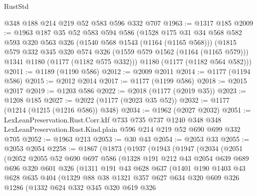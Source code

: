 \begin{lexlean}{RustStd}
\begin{coremodule}
    @348
    @188
    @214
    @219
    @52
    @583
    @596
    @332
    @707
@1963 := @1317 @185
@2009 := @1963
    @187
    @35
    @52
    @583
    @594
    @586
    (@1528
      @175
      @31
      @34
      @568
      @582
      @593
      @320
      @563
      @326
      (@1540 @568 @1543 (@1164 (@1165 @568)))
      (@1815
        @579
        @332
        @345
        @320
        @574
        @326
        (@1559 @579 @1562 (@1164 (@1165 @579)))
        @1341
        @1180
        (@1177 (@1182 @575 @332)))
      @1180
      (@1177 (@1182 @564 @582)))
@2011 := @1189 (@1190 @586)
@2012 := @2009 @2011
@2014 := @1177 (@1194 @586)
@2015 := @2012 @2014
@2017 := @1177 (@1199 @586)
@2018 := @2015 @2017
@2019 := @1203 @586
@2022 := @2018 (@1177 (@2019 @35))
@2023 := @1208 @185
@2027 := @2022 (@1177 (@2023 @35 @52))
@2032 := @1177 (@1214 (@1215 (@1216 @586)) @348)
@2034 := @1962 (@2027 @2032)
@2051 := LexLeanPreservation.Rust.Corr.kIf
    @733
    @735
    @737
    @1240
    @348
    @348
    LexLeanPreservation.Rust.Kind.plain
    @596
    @214
    @219
    @52
    @690
    @699
    @332
    @705
@2052 := @1963 @213
@2053 := @30 @43
@2054 := @2053 @33
@2055 := @2053 @2054
@2258 := @1867
    (@1873
      (@1937
        (@1943
          (@1947
            (@2034
              (@2051
                (@2052
                  @2055
                  @52
                  @690
                  @697
                  @586
                  (@1328
                    @191
                    @212
                    @43
                    @2054
                    @639
                    @689
                    @696
                    @320
                    @601
                    @326
                    (@1311
                      @191
                      @43
                      @628
                      @637
                      (@1401
                        @190
                        @1403
                        @43
                        @628
                        @635
                        @404
                        (@1329
                          @88
                          @38
                          @1321
                          @357
                          @627
                          @634
                          @320
                          @609
                          @326
                          @1286
                          (@1332
                            @624
                            @332
                            @345
                            @320
                            @619
                            @326

\end{coremodule}
\end{lexlean}
